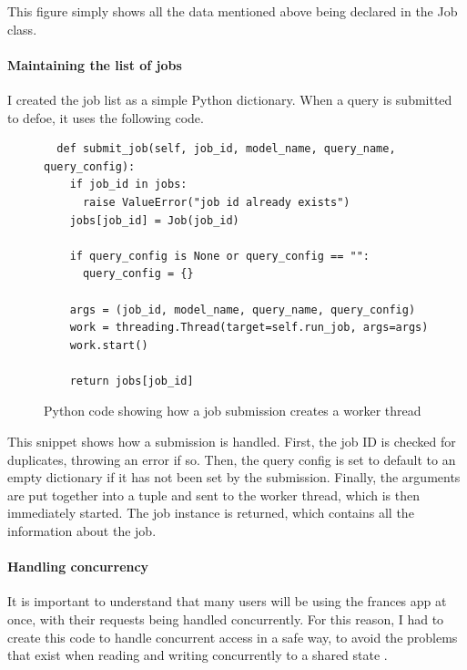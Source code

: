 \documentclass[12pt, letterpaper]{article}
\begin{document}
\begin{flushleft}
This figure simply shows all the data mentioned above being declared in the Job class.
\end{flushleft}

\paragraph{Maintaining the list of jobs}

\begin{flushleft}
I created the job list as a simple Python dictionary. When a query is submitted to defoe, it uses the following code.
\end{flushleft}

\begin{flushleft}
\begin{figure}[H]
\begin{verbatim}
  def submit_job(self, job_id, model_name, query_name, query_config):
    if job_id in jobs:
      raise ValueError("job id already exists")
    jobs[job_id] = Job(job_id)
    
    if query_config is None or query_config == "":
      query_config = {}
    
    args = (job_id, model_name, query_name, query_config)
    work = threading.Thread(target=self.run_job, args=args)
    work.start()
  
    return jobs[job_id]
\end{verbatim}
\caption{Python code showing how a job submission creates a worker thread}
\end{figure}
\end{flushleft}

\begin{flushleft}
This snippet shows how a submission is handled. First, the job ID is checked for duplicates, throwing an error if so. Then, the query config is set to default to an empty dictionary if it has not been set by the submission. Finally, the arguments are put together into a tuple and sent to the worker thread, which is then immediately started. The job instance is returned, which contains all the information about the job. 
\end{flushleft}

\paragraph{Handling concurrency}

\begin{flushleft}
It is important to understand that many users will be using the frances app at once, with their requests being handled concurrently. For this reason, I had to create this code to handle concurrent access in a safe way, to avoid the problems that exist when reading and writing concurrently to a shared state \cite{concurrency-problems}.
\end{flushleft}
\end{document}
